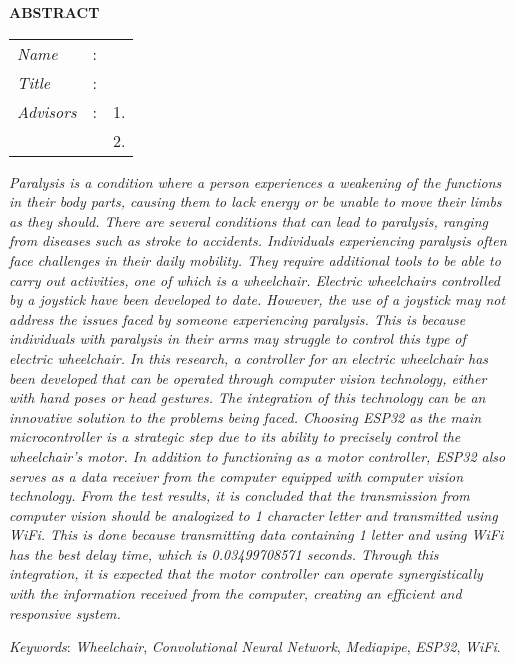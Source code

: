 \begin{center}
  \large\textbf{ABSTRACT}
\end{center}


\vspace{2ex}

\begingroup
\setlength{\tabcolsep}{0pt}

\noindent
\begin{tabularx}{\textwidth}{l >{\centering}m{3em} X}
  \emph{Name}     & : & \name{}         \\

  \emph{Title}    & : & \engtatitle{}   \\

  \emph{Advisors} & : & 1. \advisor{}   \\
                  &   & 2. \coadvisor{} \\
\end{tabularx}
\endgroup

\emph{Paralysis is a condition where a person experiences a weakening of the functions in their body parts, causing them to lack energy or be unable to move their limbs as they should. There are several conditions that can lead to paralysis, ranging from diseases such as stroke to accidents. Individuals experiencing paralysis often face challenges in their daily mobility. They require additional tools to be able to carry out activities, one of which is a wheelchair. Electric wheelchairs controlled by a joystick have been developed to date. However, the use of a joystick may not address the issues faced by someone experiencing paralysis. This is because individuals with paralysis in their arms may struggle to control this type of electric wheelchair. In this research, a controller for an electric wheelchair has been developed that can be operated through computer vision technology, either with hand poses or head gestures. The integration of this technology can be an innovative solution to the problems being faced. Choosing ESP32 as the main microcontroller is a strategic step due to its ability to precisely control the wheelchair's motor. In addition to functioning as a motor controller, ESP32 also serves as a data receiver from the computer equipped with computer vision technology. From the test results, it is concluded that the transmission from computer vision should be analogized to 1 character letter and transmitted using WiFi. This is done because transmitting data containing 1 letter and using WiFi has the best delay time, which is 0.03499708571 seconds. Through this integration, it is expected that the motor controller can operate synergistically with the information received from the computer, creating an efficient and responsive system.}

\emph{Keywords}: \emph{Wheelchair}, \emph{Convolutional Neural Network}, \emph{Mediapipe}, \emph{ESP32}, \emph{WiFi}.
